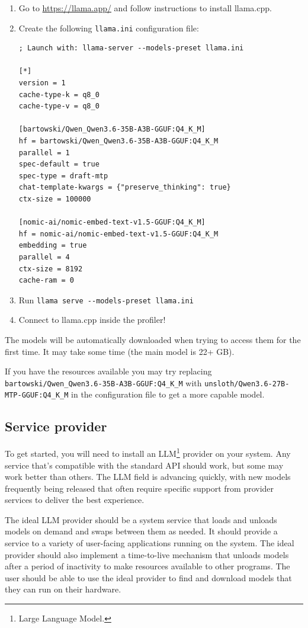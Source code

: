 \documentclass[hidelinks,titlepage,a4paper,twoside]{article}
\begin{document}
\begin{enumerate}
\item Go to \url{https://llama.app/} and follow instructions to install llama.cpp.
\item Create the following \texttt{llama.ini} configuration file:
\begin{lstlisting}
; Launch with: llama-server --models-preset llama.ini

[*]
version = 1
cache-type-k = q8_0
cache-type-v = q8_0

[bartowski/Qwen_Qwen3.6-35B-A3B-GGUF:Q4_K_M]
hf = bartowski/Qwen_Qwen3.6-35B-A3B-GGUF:Q4_K_M
parallel = 1
spec-default = true
spec-type = draft-mtp
chat-template-kwargs = {"preserve_thinking": true}
ctx-size = 100000

[nomic-ai/nomic-embed-text-v1.5-GGUF:Q4_K_M]
hf = nomic-ai/nomic-embed-text-v1.5-GGUF:Q4_K_M
embedding = true
parallel = 4
ctx-size = 8192
cache-ram = 0
\end{lstlisting}
\item Run \texttt{llama serve -{}-models-preset llama.ini}
\item Connect to llama.cpp inside the profiler!
\end{enumerate}

The models will be automatically downloaded when trying to access them for the first time. It may take some time (the main model is 22+ GB).

If you have the resources available you may try replacing \texttt{bartowski/Qwen\_Qwen3.6-35B-A3B-GGUF:Q4\_K\_M} with \texttt{unsloth/Qwen3.6-27B-MTP-GGUF:Q4\_K\_M} in the configuration file to get a more capable model.

\subsection{Service provider}

To get started, you will need to install an LLM\footnote{Large Language Model.} provider on your system. Any service that's compatible with the standard API should work, but some may work better than others. The LLM field is advancing quickly, with new models frequently being released that often require specific support from provider services to deliver the best experience.

The ideal LLM provider should be a system service that loads and unloads models on demand and swaps between them as needed. It should provide a service to a variety of user-facing applications running on the system. The ideal provider should also implement a time-to-live mechanism that unloads models after a period of inactivity to make resources available to other programs. The user should be able to use the ideal provider to find and download models that they can run on their hardware.
\end{document}
